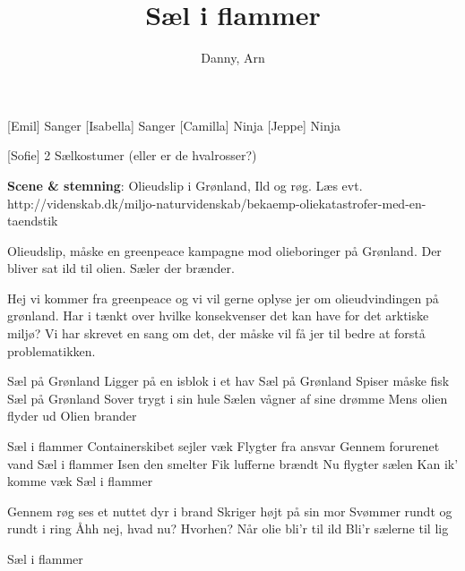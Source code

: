 \documentclass[a4paper,11pt]{article}
\title{Sæl i flammer}
\author{Danny, Arn}
\begin{document}
\maketitle

\begin{roles}
    [Emil] Sanger
    [Isabella] Sanger
    [Camilla] Ninja
    [Jeppe] Ninja
\end{roles}

\begin{props}
    [Sofie] 2 Sælkostumer (eller er de hvalrosser?)
\end{props}

\scene \textbf{Scene \& stemning}: Olieudslip i Grønland, Ild og røg. Læs evt. http://videnskab.dk/miljo-naturvidenskab/bekaemp-oliekatastrofer-med-en-taendstik

\scene Olieudslip, måske en greenpeace kampagne mod olieboringer på Grønland. Der bliver sat ild til olien. Sæler der brænder.

\begin{song}
 Hej vi kommer fra greenpeace og vi vil gerne oplyse jer om olieudvindingen på grønland.
 Har i tænkt over hvilke konsekvenser det kan have for det arktiske miljø?
 Vi har skrevet en sang om det, der måske vil få jer til bedre at forstå problematikken.

  	Sæl på Grønland
  	Ligger på en isblok i et hav
  	Sæl på Grønland
  	Spiser måske fisk
  	Sæl på Grønland
  	Sover trygt i sin hule
  	Sælen vågner af sine drømme
  	Mens olien flyder ud
  	Olien brander

  	Sæl i flammer
  	Containerskibet sejler væk
  	Flygter fra ansvar
  	Gennem forurenet vand
  	Sæl i flammer
  	Isen den smelter
  	Fik lufferne brændt
  	Nu flygter sælen
  	Kan ik' komme væk
  	Sæl i flammer

  	Gennem røg ses et nuttet dyr i brand
  	Skriger højt på sin mor
				Svømmer rundt og rundt i ring
  	Åhh nej, hvad nu? Hvorhen?
  	Når olie bli'r til ild
  	Bli'r sælerne til lig

   Sæl i flammer

\end{song}
\end{document}
